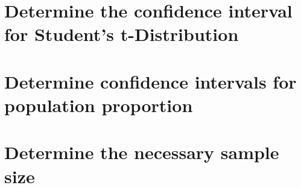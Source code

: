 \documentclass[t]{beamer}
\begin{document}
\section{Determine the confidence interval for Student's t-Distribution}

\section{Determine confidence intervals for population proportion}

\section{Determine the necessary sample size}
\end{document}
